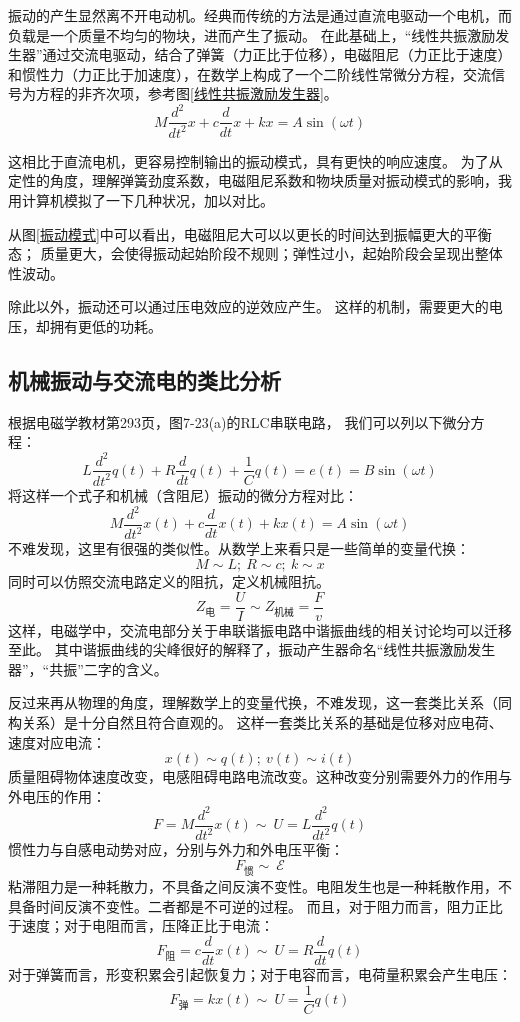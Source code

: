 \documentclass[UTF-8]{ctexart}
\begin{document}
振动的产生显然离不开电动机。经典而传统的方法是通过直流电驱动一个电机，而负载是一个质量不均匀的物块，进而产生了振动。
在此基础上，“线性共振激励发生器”通过交流电驱动，结合了弹簧（力正比于位移），电磁阻尼（力正比于速度）和惯性力（力正比于加速度），在数学上构成了一个二阶线性常微分方程，交流信号为方程的非齐次项，参考图\ref{线性共振激励发生器}。
$$
M\frac{d^2}{dt^2}x+c\frac{d}{dt}x+kx=A\sin(\omega t)
$$

这相比于直流电机，更容易控制输出的振动模式，具有更快的响应速度。
为了从定性的角度，理解弹簧劲度系数，电磁阻尼系数和物块质量对振动模式的影响，我用计算机模拟了一下几种状况，加以对比。

从图\ref{振动模式}中可以看出，电磁阻尼大可以以更长的时间达到振幅更大的平衡态；
质量更大，会使得振动起始阶段不规则；弹性过小，起始阶段会呈现出整体性波动。

除此以外，振动还可以通过压电效应的逆效应产生。
这样的机制，需要更大的电压，却拥有更低的功耗。
\subsection{机械振动与交流电的类比分析}
根据电磁学教材第293页，图7-23(a)的RLC串联电路， 我们可以列以下微分方程：
$$
L\frac{d^2}{dt^2}q(t)+R\frac{d}{dt}q(t)+\frac{1}{C}q(t)=e(t)=B\sin(\omega t)
$$
将这样一个式子和机械（含阻尼）振动的微分方程对比：
$$
M\frac{d^2}{dt^2}x(t)+c\frac{d}{dt}x(t)+kx(t)=A\sin(\omega t)
$$
不难发现，这里有很强的类似性。从数学上来看只是一些简单的变量代换：
$$
M \sim L;\ R \sim c;\ k \sim x
$$
同时可以仿照交流电路定义的阻抗，定义机械阻抗\cite{newconcept}。
$$
Z_{\text{电}}=\frac{U}{I}\sim Z_{\text{机械}}=\frac{F}{v}
$$
这样，电磁学中，交流电部分关于串联谐振电路中谐振曲线的相关讨论均可以迁移至此。
其中谐振曲线的尖峰很好的解释了，振动产生器命名“线性共振激励发生器”，“共振”二字的含义。

反过来再从物理的角度，理解数学上的变量代换，不难发现，这一套类比关系（同构关系）是十分自然且符合直观的。
这样一套类比关系的基础是位移对应电荷、速度对应电流：
$$
x(t)\sim q(t);\ v(t)\sim i(t)
$$
质量阻碍物体速度改变，电感阻碍电路电流改变。这种改变分别需要外力的作用与外电压的作用：
$$
F=M\frac{d^2}{dt^2}x(t)\sim \ U=L\frac{d^2}{dt^2}q(t)
$$
惯性力与自感电动势对应，分别与外力和外电压平衡：
$$
F_{\text{惯}}\sim\ \mathcal{E} 
$$
粘滞阻力是一种耗散力，不具备之间反演不变性。电阻发生也是一种耗散作用，不具备时间反演不变性。二者都是不可逆的过程。
而且，对于阻力而言，阻力正比于速度；对于电阻而言，压降正比于电流：
$$
F_{\text{阻}}=c\frac{d}{dt}x(t)\sim \ U=R\frac{d}{dt}q(t)
$$
对于弹簧而言，形变积累会引起恢复力；对于电容而言，电荷量积累会产生电压：
$$
F_{\text{弹}}=kx(t)\sim\ U=\frac{1}{C}q(t)
$$
\end{document}
